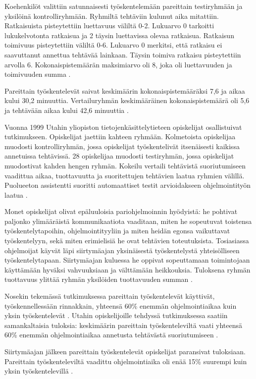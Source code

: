\documentclass[finnish]{tktltiki2}
\theoremstyle{definition}
\theoremstyle{remark}
\begin{document}
Koehenkilöt valittiin satunnaisesti työskentelemään pareittain testiryhmään ja yksilöinä kontrolliryhmään.
Ryhmiltä tehtäviin kulunut aika mitattiin. Ratkaisuista pisteytettiin luettavuus väliltä 0-2. Lukuarvo 0 tarkoitti lukukelvotonta ratkaisua ja 2 täysin luettavissa olevaa ratkaisua. Ratkaisun toimivuus pisteytettiin väliltä 0-6. Lukuarvo 0 merkitsi, että ratkaisu ei saavuttanut annettua tehtävää lainkaan. Täysin toimiva ratkaisu pisteytettiin arvolla 6. Kokonaispistemäärän maksimiarvo oli 8, joka oli luettavuuden ja toimivuuden summa \cite{NOS98}.

Pareittain työskentelevät saivat keskimäärin kokonaispistemääräksi 7,6 ja aikaa kului 30,2 minuuttia. Vertailuryhmän keskimääräinen kokonaispistemäärä oli 5,6 ja tehtävään aikaa kului 42,6 minuuttia \cite{NOS98}.

Vuonna 1999 Utahin yliopiston tietojenkäsittelytieteen opiskelijat osallistuivat tutkimukseen. Opiskelijat jaettiin kahteen ryhmään. Kolmetoista opiskelijaa muodosti kontrolliryhmän, jossa opiskelijat työskentelivät itsenäisesti kaikissa annetuissa tehtävissä. 28 opiskelijaa muodosti testiryhmän, jossa opiskelijat muodostivat kahden hengen ryhmän. Kokeilu vertaili tehtävistä suoriutumiseen vaadittua aikaa, tuottavuutta ja suoritettujen tehtävien laatua ryhmien välillä. Puolueeton assistentti suoritti automaattiset testit arvioidakseen ohjelmointityön laatua \cite{WIL00}.

Monet opiskelijat olivat epäluuloisia pariohjelmoinnin hyödyistä: he pohtivat paljonko ylimääräistä kommunikaatiota vaaditaan, miten he sopeutuvat toistensa työskentelytapoihin, ohjelmointityyliin ja miten heidän egonsa vaikuttavat työskentelyyn, sekä miten erimielisiä he ovat tehtävien toteutuksista. Tosiasiassa ohjelmoijat käyvät läpi siirtymäajan yksinäisestä työskentelystä yhteisölliseen työskentelytapaan. Siirtymäajan kuluessa he oppivat sopeuttamaan toimintojaan käyttämään hyväksi vahvuuksiaan ja välttämään heikkouksia. Tuloksena ryhmän tuottavuus ylittää ryhmän yksilöiden tuottavuuden summan \cite{WIL00}.

Nosekin tekemässä tutkimuksessa pareittain työskentelevät käyttivät, työskennellessään rinnakkain, yhteensä 60\% enemmän ohjelmointiaikaa kuin yksin työskentelevät \cite{NOS98}. Utahin opiskelijoille tehdyssä tutkimuksessa saatiin samankaltaisia tuloksia: keskimäärin pareittain työskenteleviltä vaati yhteensä 60\% enemmän ohjelmointiaikaa annetusta tehtävästä suoriutumiseen \cite{WIL00}.

Siirtymäajan jälkeen pareittain työskentelevät opiskelijat paransivat tuloksiaan. Pareittain työskenteleviltä vaadittu ohjelmointiaika oli enää 15\% suurempi kuin yksin työskentelevillä \cite{WIL00}.
\end{document}
